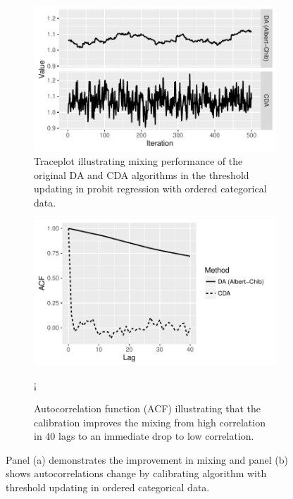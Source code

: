 \documentclass[10pt]{article}
\begin{document}
\begin{figure}[H]
  \begin{subfigure}[b]{0.49\textwidth}
 \includegraphics[width=1\textwidth]{ordered_probit_trace_plot.pdf}
  \caption{Traceplot illustrating mixing performance of the original DA and CDA algorithms in the threshold updating in probit regression with ordered categorical data.}
\end{subfigure}
  \hfill
   \begin{subfigure}[b]{0.49\textwidth}
 \includegraphics[width=1\textwidth]{ordered_probit_acf.pdf}
  \caption{Autocorrelation function (ACF) illustrating that the calibration improves the mixing from high correlation in $40$ lags to an immediate drop to low correlation.  
  }¡
\end{subfigure}
 \caption{Panel (a) demonstrates the improvement in mixing and panel (b) shows autocorrelations change by calibrating  \cite{albert1993bayesian} algorithm with threshold updating in ordered categorical data.}
  \label{ordered_probit}
 \end{figure}
 
\end{document}
